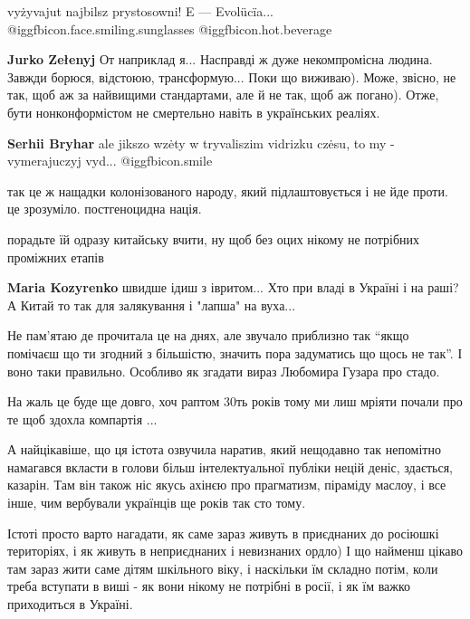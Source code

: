 \begin{itemize}
\begin{itemize}
\end{itemize} %

vyżyvajut najbilsz prystosowni!
E — Evolücïa...
 @igg{fbicon.face.smiling.sunglasses}  @igg{fbicon.hot.beverage} 

\begin{itemize} %
\textbf{Jurko Zełenyj} От наприклад я... Насправді ж дуже некомпромісна людина. Завжди борюся, відстоюю, трансформую... Поки що виживаю). Може, звісно, не так, щоб аж за найвищими стандартами, але й не так, щоб аж погано). Отже, бути нонконформістом не смертельно навіть в українських реаліях.

\textbf{Serhii Bryhar} ale jikszo wzėty w tryvaliszim vidrizku czėsu, to my - vymerajuczyj vyd...  @igg{fbicon.smile} 
\end{itemize} %

так це ж нащадки колонізованого народу, який підлаштовується і не йде проти. це зрозуміло. постгеноцидна нація.

порадьте їй одразу китайську вчити, ну щоб без оцих нікому не потрібних проміжних етапів

\textbf{Maria Kozyrenko} швидше ідиш з івритом... Хто при владі в Україні і на раші? А Китай то так для залякування і "лапша" на вуха...


Не пам'ятаю де прочитала це на днях, але звучало приблизно так \enquote{якщо помічаєш
що ти згодний з більшістю, значить пора задуматись що щось не так}. І воно таки
правильно. Особливо як згадати вираз Любомира Гузара про стадо.

На жаль це буде ще довго, хоч раптом 30ть років тому ми лиш мріяти почали про те щоб здохла компартія ...


А найцікавіше, що ця істота озвучила наратив, який нещодавно так непомітно
намагався вкласти в голови більш інтелектуальної публіки нецій деніс, здається,
казарін. Там він також ніс якусь ахінєю про прагматизм, піраміду маслоу, і все
інше, чим вербували українців ще років так сто тому.

Істоті просто варто нагадати, як саме зараз живуть в приєднаних до росіюшкі
територіях, і як живуть в неприєднаних і невизнаних ордло) І що найменш цікаво
там зараз жити саме дітям шкільного віку, і наскільки їм складно потім, коли
треба вступати в виші - як вони нікому не потрібні в росії, і як їм важко
приходиться в Україні.


\end{itemize}

